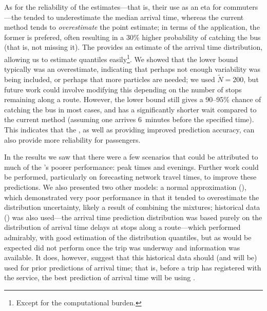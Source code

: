As for the reliability of the estimates---that is, their use as an \gls{eta} for commuters---the \pf{} tended to underestimate the median arrival time, whereas the current method tends to \emph{overestimate} the point estimate; in terms of the application, the former is prefered, often resulting in a 30\% higher probability of catching the bus (that is, not missing it). The \pf{} provides an estimate of the arrival time distribution, allowing us to estimate quantiles easily\footnote{Except for the computational burden.}. We showed that the lower bound typically was an overestimate, indicating that perhaps not enough variability was being included, or perhaps that more particles are needed; we used $\tilde N = 200$, but future work could involve modifying this depending on the number of stops remaining along a route. However, the lower bound still gives a 90--95\% chance of catching the bus in most cases, and has a significantly shorter wait compared to the current method (assuming one arrives 6~minutes before the specified time). This indicates that the \pf{}, as well as providing improved prediction accuracy, can also provide more reliability for passengers.


In the results we saw that there were a few scenarios that could be attributed to much of the \pf{}'s poorer performance: peak times and evenings. Further work could be performed, particularly on forecasting network travel times, to improve these predictions. We also presented two other models: a normal approximation (\Fnorm{}), which demonstrated very poor performance in that it tended to overestimate the distribution uncertainty, likely a result of combining the mixtures; historical data (\Fhist{}) was also used---the arrival time prediction distribution was based purely on the distribution of arrival time delays at stops along a route---which performed admirably, with good estimation of the distribution quantiles, but as would be expected did not perform once the trip was underway and \rt{} information was available. It does, however, suggest that this historical data should (and will be) used for prior predictions of arrival time; that is, before a trip has registered with the \rt{} service, the best prediction of arrival time will be using \Fhist{}.
